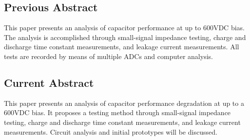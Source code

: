\subsection{Previous Abstract}
This paper presents an analysis of capacitor performance at up to 600VDC bias. The analysis is accomplished through small-signal impedance testing, charge and discharge time constant measurements, and leakage current measurements. All tests are recorded by means of multiple ADCs and computer analysis.

\subsection{Current Abstract}
\label{sec:abstract}
This paper presents an analysis of capacitor performance degradation at up to a 600VDC bias. It proposes a testing method through small-signal impedance testing, charge and discharge time constant measurements, and leakage current measurements. Circuit analysis and initial prototypes will be discussed.

